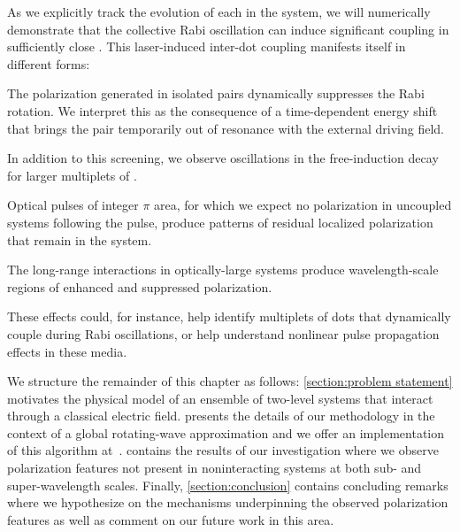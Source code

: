 As we explicitly track the evolution of each \qd{} in the system, we will numerically demonstrate that the collective Rabi oscillation can induce significant coupling in sufficiently close \qds{}.
This laser-induced inter-dot coupling manifests itself in different forms:
\begin{inparaenum}[(i)]
  \item The polarization generated in isolated \qd{} pairs dynamically suppresses the Rabi rotation.
  We interpret this as the consequence of a time-dependent energy shift that brings the pair temporarily out of resonance with the external driving field.
  \item In addition to this screening, we observe oscillations in the free-induction decay for larger multiplets of \qds{}.
  \item Optical pulses of integer $\pi$ area, for which we expect no polarization in uncoupled systems following the pulse, produce patterns of residual localized polarization that remain in the system.
  \item The long-range interactions in optically-large systems produce wavelength-scale regions of enhanced and suppressed polarization.
\end{inparaenum}
These effects could, for instance, help identify multiplets of dots that dynamically couple during Rabi oscillations, or help understand nonlinear pulse propagation effects in these media.

We structure the remainder of this chapter as follows: \cref{section:problem statement} motivates the physical model of an ensemble of two-level systems that interact through a classical electric field.
 presents the details of our methodology in the context of a global rotating-wave approximation and we offer an implementation of this algorithm at~\cite{quest_release}.
 contains the results of our investigation where we observe polarization features not present in noninteracting systems at both sub- and super-wavelength scales.
Finally, \cref{section:conclusion} contains concluding remarks where we hypothesize on the mechanisms underpinning the observed polarization features as well as comment on our future work in this area.
